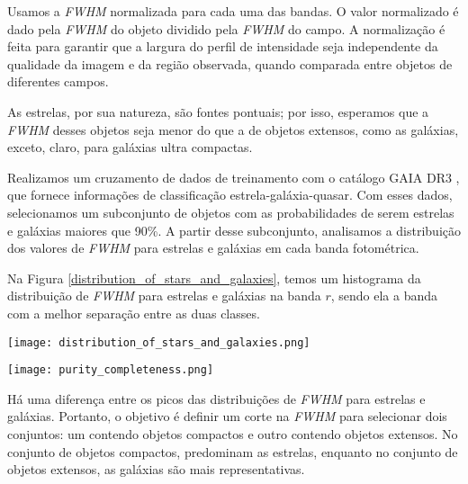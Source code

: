 Usamos a \textit{FWHM} normalizada para cada uma das bandas. O valor normalizado é dado pela \textit{FWHM} do objeto dividido pela \textit{FWHM} do campo. A normalização é feita para garantir que a largura do perfil de intensidade seja independente da qualidade da imagem e da região observada, quando comparada entre objetos de diferentes campos.

As estrelas, por sua natureza, são fontes pontuais; por isso, esperamos que a \textit{FWHM} desses objetos seja menor do que a de objetos extensos, como as galáxias, exceto, claro, para galáxias ultra compactas.

Realizamos um cruzamento de dados de treinamento com o catálogo GAIA DR3 \citep{GAIA_DR3}, que fornece informações de classificação estrela-galáxia-quasar. Com esses dados, selecionamos um subconjunto de objetos com as probabilidades de serem estrelas e galáxias maiores que 90\%. A partir desse subconjunto, analisamos a distribuição dos valores de \textit{FWHM} para estrelas e galáxias em cada banda fotométrica.

Na Figura \ref{distribution_of_stars_and_galaxies}, temos um histograma da distribuição de \textit{FWHM} para estrelas e galáxias na banda $r$, sendo ela a banda com a melhor separação entre as duas classes.

\begin{center}
    \begin{minipage}{0.45\textwidth}
        \centering
        \texttt{[image: distribution\_of\_stars\_and\_galaxies.png]}
        \captionsetup{}
        \label{distribution_of_stars_and_galaxies}
    \end{minipage}
    \hfill
    \begin{minipage}{0.45\textwidth}
        \centering
        \texttt{[image: purity\_completeness.png]}
        \captionsetup{}
        \label{purity_completeness}
    \end{minipage}
\end{center}

Há uma diferença entre os picos das distribuições de \textit{FWHM} para estrelas e galáxias. Portanto, o objetivo é definir um corte na \textit{FWHM} para selecionar dois conjuntos: um contendo objetos compactos e outro contendo objetos extensos. No conjunto de objetos compactos, predominam as estrelas, enquanto no conjunto de objetos extensos, as galáxias são mais representativas.

